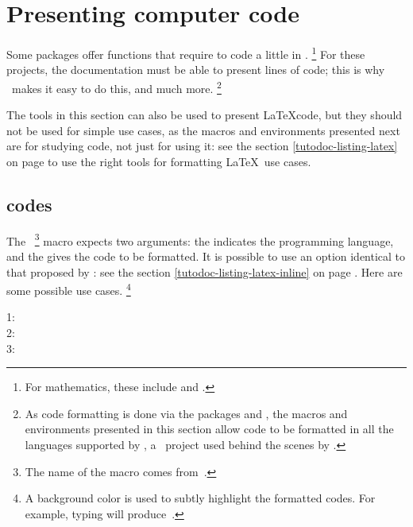 \documentclass{tutodoc}
\begin{document}
\section{Presenting computer code}

Some packages offer functions that require to code a little in \lua.%
\footnote{
	For mathematics, these include  and .
}
For these projects, the documentation must be able to present lines of code; this is why \thisproj\ makes it easy to do this, and much more.%
\footnote{
    As code formatting is done via the packages  and , the macros and environments presented in this section allow code to be formatted in all the languages supported by \pygmentsREF, a \python\ project used behind the scenes by .
}


\begin{tdocimp}
	The tools in this section can also be used to present \LaTeX code, but they should not be used for simple use cases, as the macros and environments presented next are for studying code, not just for using it: see the section \ref{tutodoc-listing-latex} on page \pageref{tutodoc-listing-latex} to use the right tools for formatting \LaTeX\ use cases.
\end{tdocimp}



\subsection{ codes}

The \,%
\footnote{
	The name of the macro  comes from \,.
}
macro expects two arguments: the  indicates the programming language, and the  gives the code to be formatted.
It is possible to use an option identical to that proposed by : see the section \ref{tutodoc-listing-latex-inline} on page \pageref{tutodoc-listing-latex-inline}.
Here are some possible use cases.%
\footnote{
    A background color is used to subtly highlight the formatted codes. For example, typing  will produce \,.
}

\begin{tdoclatex}
1:              \\
2:  \\
3: 
\end{tdoclatex}
\end{document}
